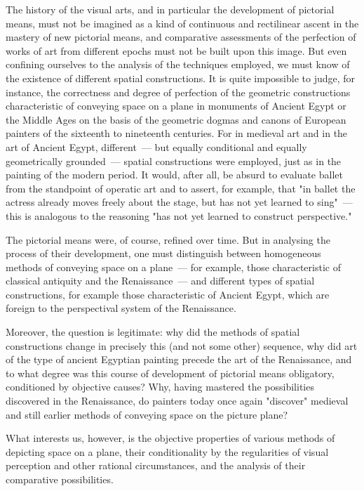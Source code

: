 
The history of the visual arts, and in particular the development of pictorial means,
must not be imagined as a kind of continuous and rectilinear ascent in the mastery of
new pictorial means, and comparative assessments of the perfection of works of art from
different epochs must not be built upon this image. But even confining ourselves to the
analysis of the techniques employed, we must know of the existence of different spatial
constructions. It is quite impossible to judge, for instance, the correctness and degree of
perfection of the geometric constructions characteristic of conveying space on a plane in
monuments of Ancient Egypt or the Middle Ages on the basis of the geometric dogmas
and canons of European painters of the sixteenth to nineteenth centuries. For in medieval
art and in the art of Ancient Egypt, different~--- but equally conditional and equally
geometrically grounded~--- spatial constructions were employed, just as in the painting of
the modern period. It would, after all, be absurd to evaluate ballet from the standpoint of
operatic art and to assert, for example, that "in ballet the actress already moves freely
about the stage, but has not yet learned to sing"~--- this is analogous to the reasoning
"has not yet learned to construct perspective."

The pictorial means were, of course, refined over time. But in analysing the process of
their development, one must distinguish between homogeneous methods of conveying
space on a plane~--- for example, those characteristic of classical antiquity and the
Renaissance~--- and different types of spatial constructions, for example those
characteristic of Ancient Egypt, which are foreign to the perspectival system of the
Renaissance.

Moreover, the question is legitimate: why did the methods of spatial constructions
change in precisely this (and not some other) sequence, why did art of the type of
ancient Egyptian painting precede the art of the Renaissance, and to what degree was
this course of development of pictorial means obligatory, conditioned by objective
causes? Why, having mastered the possibilities discovered in the Renaissance, do
painters today once again "discover" medieval and still earlier methods of conveying
space on the picture plane?

What interests us, however, is the objective properties of various methods of depicting
space on a plane, their conditionality by the regularities of visual perception and other
rational circumstances, and the analysis of their comparative possibilities.

